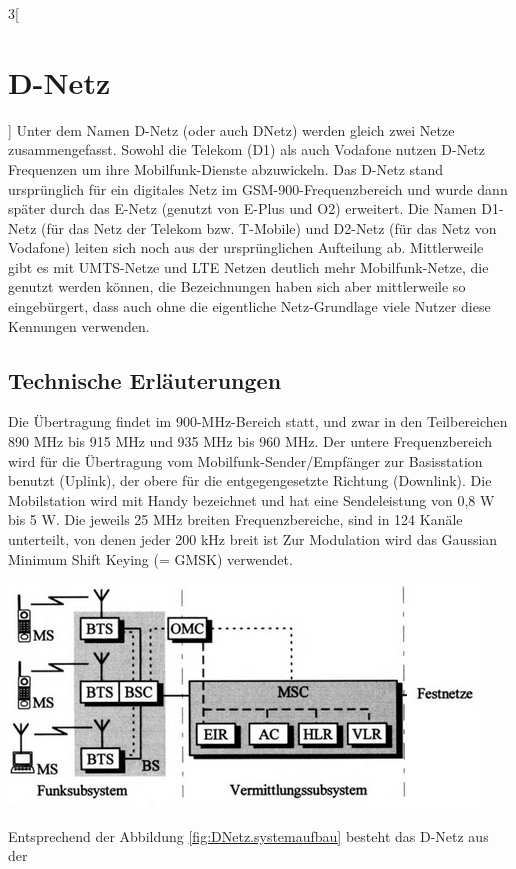 \begin{multicols}{3}[\section {D-Netz}]
Unter dem Namen D-Netz (oder auch DNetz) werden gleich zwei Netze zusammengefasst. Sowohl die Telekom (D1) als auch Vodafone nutzen D-Netz Frequenzen um ihre Mobilfunk-Dienste abzuwickeln. Das D-Netz stand ursprünglich für ein digitales Netz im GSM-900-Frequenzbereich und wurde dann später durch das E-Netz (genutzt von E-Plus und O2) erweitert. Die Namen D1-Netz (für das Netz der Telekom bzw. T-Mobile) und D2-Netz (für das Netz von Vodafone) leiten sich noch aus der ursprünglichen Aufteilung ab.
Mittlerweile gibt es mit UMTS-Netze und LTE Netzen deutlich mehr Mobilfunk-Netze, die genutzt werden können, die Bezeichnungen haben sich aber mittlerweile so eingebürgert, dass auch ohne die eigentliche Netz-Grundlage viele Nutzer diese Kennungen verwenden.


\subsection*{Technische Erläuterungen}

Die Übertragung findet im 900-MHz-Bereich statt, und zwar in den Teilbereichen 890 MHz bis 915 MHz und 935 MHz bis 960 MHz. Der untere Frequenzbereich wird für die Übertragung vom Mobilfunk-Sender/Empfänger zur Basisstation benutzt (Uplink), der obere für die entgegengesetzte Richtung (Downlink). Die Mobilstation wird mit Handy bezeichnet und hat eine Sendeleistung von 0,8 W bis 5 W. Die jeweils 25 MHz breiten Frequenzbereiche, sind in 124 Kanäle unterteilt, von denen jeder 200 kHz breit ist Zur Modulation wird das Gaussian Minimum Shift Keying (= GMSK) verwendet. 

\begin{Figure}
\includegraphics[width=\linewidth]{Kapitel/DNetz/Grafiken/systemaufbau.png}
\label{fig:DNetz.systemaufbau}
\end{Figure}

Entsprechend der Abbildung \ref{fig:DNetz.systemaufbau} besteht das D-Netz aus der 


\end{multicols}
